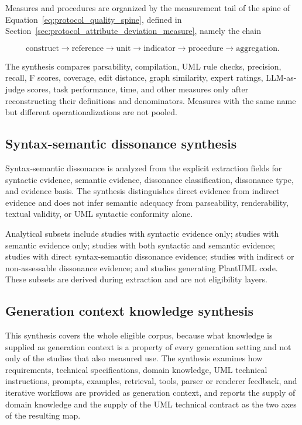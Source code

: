 Measures and procedures are organized by the measurement tail of the spine of Equation~\ref{eq:protocol_quality_spine}, defined in Section~\ref{sec:protocol_attribute_deviation_measure}, namely the chain

\begin{equation}
\text{construct} \rightarrow \text{reference} \rightarrow \text{unit} \rightarrow \text{indicator} \rightarrow \text{procedure} \rightarrow \text{aggregation}.
\label{eq:protocol_metrology_chain}
\end{equation}

The synthesis compares parsability, compilation, UML rule checks, precision, recall, F scores, coverage, edit distance, graph similarity, expert ratings, LLM-as-judge scores, task performance, time, and other measures only after reconstructing their definitions and denominators. Measures with the same name but different operationalizations are not pooled.

\subsection{Syntax-semantic dissonance synthesis}

Syntax-semantic dissonance is analyzed from the explicit extraction fields for syntactic evidence, semantic evidence, dissonance classification, dissonance type, and evidence basis. The synthesis distinguishes direct evidence from indirect evidence and does not infer semantic adequacy from parseability, renderability, textual validity, or UML syntactic conformity alone.

Analytical subsets include studies with syntactic evidence only; studies with semantic evidence only; studies with both syntactic and semantic evidence; studies with direct syntax-semantic dissonance evidence; studies with indirect or non-assessable dissonance evidence; and studies generating PlantUML code. These subsets are derived during extraction and are not eligibility layers.

\subsection{Generation context knowledge synthesis}

This synthesis covers the whole eligible corpus, because what knowledge is supplied as generation context is a property of every generation setting and not only of the studies that also measured use. The synthesis examines how requirements, technical specifications, domain knowledge, UML technical instructions, prompts, examples, retrieval, tools, parser or renderer feedback, and iterative workflows are provided as generation context, and reports the supply of domain knowledge and the supply of the UML technical contract as the two axes of the resulting map.

